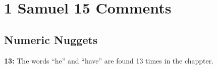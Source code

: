 \section{1 Samuel 15 Comments}

\subsection{Numeric Nuggets}
\textbf{13: } The words ``he'' and ``have'' are found 13 times in the chappter.